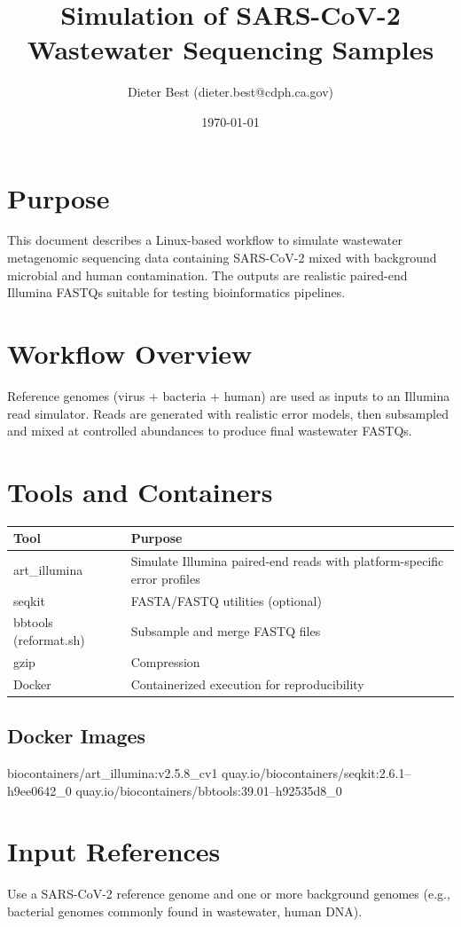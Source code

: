 \documentclass[11pt]{article}
\title{Simulation of SARS-CoV-2 Wastewater Sequencing Samples}
\author{Dieter Best (dieter.best@cdph.ca.gov)}
\date{\today}
\begin{document}
\maketitle

\section*{Purpose}
This document describes a Linux-based workflow to simulate wastewater
metagenomic sequencing data containing SARS-CoV-2 mixed with
background microbial and human contamination. The outputs are realistic
paired-end Illumina FASTQs suitable for testing bioinformatics
pipelines.

\section*{Workflow Overview}
Reference genomes (virus + bacteria + human) are used as
inputs to an Illumina read simulator. Reads are generated with
realistic error models, then subsampled and mixed at controlled
abundances to produce final wastewater FASTQs.

\section*{Tools and Containers}
\begin{longtable}{p{} p{}}
\toprule
\textbf{Tool} & \textbf{Purpose} \\
\midrule
art\_illumina & Simulate Illumina paired-end reads with platform-specific error profiles \\
seqkit & FASTA/FASTQ utilities (optional) \\
bbtools (reformat.sh) & Subsample and merge FASTQ files \\
gzip & Compression \\
Docker & Containerized execution for reproducibility \\
\bottomrule
\end{longtable}

\subsection*{Docker Images}
\begin{Code}
biocontainers/art_illumina:v2.5.8_cv1
quay.io/biocontainers/seqkit:2.6.1--h9ee0642_0
quay.io/biocontainers/bbtools:39.01--h92535d8_0
\end{Code}

\section*{Input References}
Use a SARS-CoV-2 reference genome and one or more background genomes (e.g., bacterial genomes commonly found in wastewater, human DNA).
\end{document}
